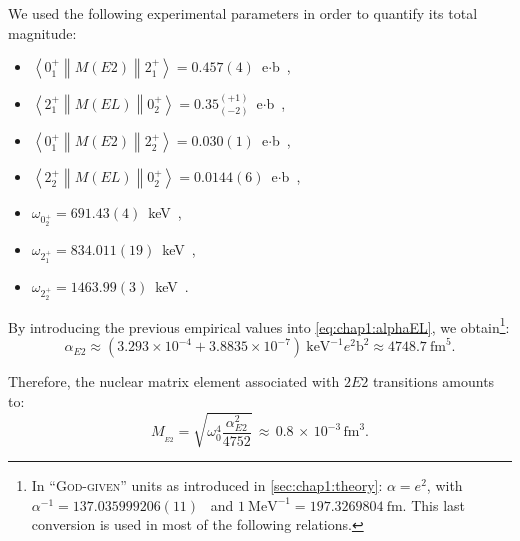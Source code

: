 We used the following experimental parameters in order to quantify its total magnitude:
\begin{center}
    \begin{minipage}{0.54\textwidth}
    \begin{itemize}
        \item $\left\langle 0_1^+ \middle\| M(E2) \middle\| 2^+_1   \right\rangle = 0.457(4)$~e$\cdot$b~\cite{Ayangeakaa-2016},
        \item $\left\langle 2^+_1 \middle\| M(EL) \middle\| 0_2^+   \right\rangle = 0.35^{(+1)}_{(-2)}$~e$\cdot$b~\cite{Ayangeakaa-2016},
        \item $\left\langle 0_1^+ \middle\| M(E2) \middle\| 2^+_2   \right\rangle = 0.030(1)$~e$\cdot$b~\cite{Ayangeakaa-2016},
        \item $\left\langle 2^+_2 \middle\| M(EL) \middle\| 0_2^+   \right\rangle = 0.0144(6)$~e$\cdot$b~\cite{Ayangeakaa-2016},
        \item $\omega_{0^+_2} = 691.43(4)$~keV~\cite{ABRIOLAA72},
        \item $\omega_{2^+_1} = 834.011(19)$~keV~\cite{ABRIOLAA72},
        \item $\omega_{2^+_2} = 1463.99(3)$~keV~\cite{ABRIOLAA72}.
    \end{itemize}
    \end{minipage}
\end{center}

By introducing the previous empirical values into \cref{eq:chap1:alphaEL}, we obtain\footnote{In ``\textsc{God-given}'' units as introduced in \cref{sec:chap1:theory}: $\alpha = e^2$, with $\alpha^{-1} = 137.035999206(11)$~\cite{alphaNature} and $1~\mathrm{MeV}^{-1} = 197.3269804~\mathrm{fm}$. This last conversion is used in most of the following relations.}:
\begin{equation}
    \alpha_{E2} \approx \left(3.293 \times 10^{-4} + 3.8835 \times 10^{-7}\right)~\mathrm{keV}^{-1}e^2\mathrm{b}^2 \approx 4748.7~\mathrm{fm}^5.
    \label{eq:chap3:alphaE2_calc2}
\end{equation}

Therefore, the nuclear matrix element associated with $2E2$ transitions amounts to:
\begin{equation}
    M_{_{E2}} = \sqrt{\omega_0^{4}\frac{\alpha_{E2}^{2}}{4752}}\,\approx\,0.8\,\times\,10^{-3}\,\mathrm{fm}^{3}.
    \label{eq:chap3:NME_E2}
\end{equation}

